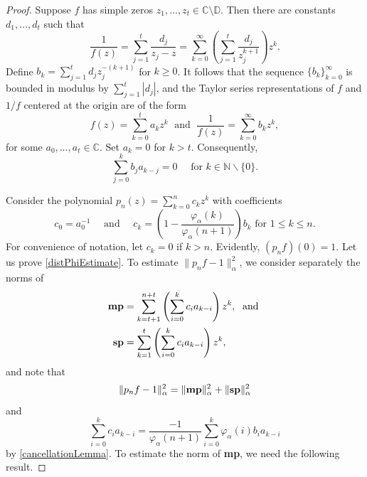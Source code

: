 \documentclass[11 pt,reqno]{amsart}
\theoremstyle{definition}
\theoremstyle{remark}
\numberwithin{equation}{section} \numberwithin{figure}{section}
\newcommand{\CC}{{\mathbb C}}
\newcommand{\DD}{{\mathbb D}}
\newcommand{\NN}{{\mathbb N}}
\begin{document}
\begin{proof}
            Suppose $f$ has simple zeros $z_1,\ldots, z_{t}\in\CC\setminus\DD$.  Then there
            are constants $d_1,\ldots,d_{t}$ such that
            \[  \frac{1}{f(z)}=\sum_{j=1}^{t}\frac{d_{j}}{z_{j}-z}
                    =\sum_{k=0}^{\infty}\left(\sum_{j=1}^{t}\frac{d_{j}}{z_{j}^{k+1}}\right)z^{k}.  \]
            Define $b_{k}=\sum_{j=1}^{t}d_{j} z_{j}^{-(k+1)}$ for $k\geq 0$.  It follows that
            the sequence $\{b_{k}\}_{k=0}^{\infty}$ is bounded in modulus by $\sum_{j=1}^{t}|d_{j}|$,
            and the Taylor series representations of $f$ and $1/f$ centered at the origin
            are of the form
            \[  f(z)=\sum_{k=0}^{t}a_kz^k\;\text{ and }\;
                    \frac{1}{f(z)}=\sum_{k=0}^{\infty}b_k z^k,  \]
            for some $a_0,\ldots,a_{t}\in\CC$.  Set $a_{k}=0$ for $k>t$.  Consequently,
            \begin{equation}\label{cancellationLemma}
                        \sum_{j=0}^k b_j a_{k-j}=0\quad\text{ for }k\in\NN \backslash\{0\}.
            \end{equation}

            Consider the polynomial $p_{n}(z) = \sum_{k=0}^n c_k z^k$ with coefficients
            \begin{equation*}
                        c_{0}=a_{0}^{-1}\quad\text{ and }\quad
                        c_k = \left(1-\frac{\varphi_{\alpha}(k)}{\varphi_{\alpha}(n+1)}\right) b_k
                        \text{ for }1\leq k\leq n.
            \end{equation*}
            For convenience of notation, let $c_k = 0$ if $k >n$.  Evidently,
            $(p_{n}f)(0)=1$. Let us prove \eqref{distPhiEstimate}.  To estimate
            $\|p_{n}f-1\|_{\alpha}^{2}$, we consider separately the norms of
            \begin{align*}
                        {\bf mp}&=\sum_{k=t+1}^{n+t}\left(\sum_{i=0}^k c_i a_{k-i}\right)z^k,\;\text{ and }\\
                        {\bf sp}&=\sum_{k=1}^t\left(\sum_{i=0}^k c_i a_{k-i}\right)z^k,
            \end{align*}
            and note that
            \begin{equation}\label{sumOfNorms}
                        \|p_{n}f-1\|_{\alpha}^{2}=\|{\bf mp}\|_{\alpha}^{2}+\|{\bf sp}\|_{\alpha}^{2}
            \end{equation}
            and
            \begin{equation}\label{coeffCk}
                        \sum_{i=0}^k c_i a_{k-i}=
                        \frac{-1}{\varphi_{\alpha}(n+1)}\sum_{i=0}^k \varphi_{\alpha}(i)b_{i}a_{k-i}
            \end{equation}
            by \eqref{cancellationLemma}.  To estimate the norm of {\bf mp}, we need the
            following result.


\end{proof}
\end{document}

